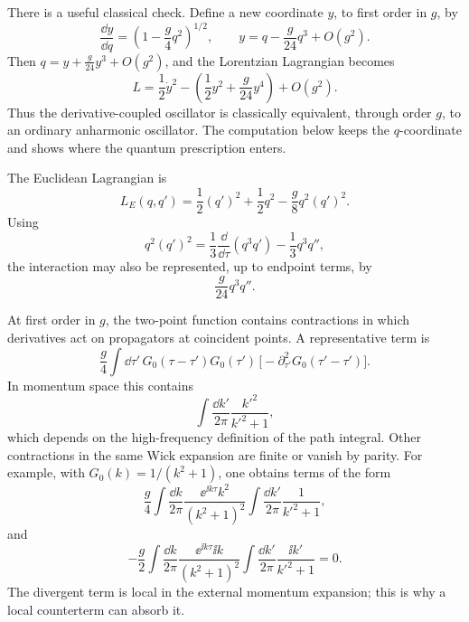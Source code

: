 There is a useful classical check. Define a new coordinate \(y\), to first
order in \(g\), by
\[
  \frac{\dd y}{\dd q}
  =
  \left(1-\frac{g}{4}q^2\right)^{1/2},
  \qquad
  y=q-\frac{g}{24}q^3+O(g^2).
\]
Then \(q=y+\frac{g}{24}y^3+O(g^2)\), and the Lorentzian Lagrangian becomes
\[
  L
  =
  \frac12\dot y^2
  -
  \left(
    \frac12y^2+\frac{g}{24}y^4
  \right)
  +O(g^2).
\]
Thus the derivative-coupled oscillator is classically equivalent, through
order \(g\), to an ordinary anharmonic oscillator. The computation below keeps
the \(q\)-coordinate and shows where the quantum prescription enters.

The Euclidean Lagrangian is
\[
  L_E(q,q')
  =
  \frac12(q')^2+\frac12q^2-\frac{g}{8}q^2(q')^2 .
\]
Using
\[
  q^2(q')^2
  =
  \frac13\frac{\dd}{\dd\tau}(q^3q')
  -\frac13q^3q'',
\]
the interaction may also be represented, up to endpoint terms, by
\[
  \frac{g}{24}q^3q''.
\]

At first order in \(g\), the two-point function contains contractions in
which derivatives act on propagators at coincident points. A representative
term is
\[
  \frac{g}{4}\int\dd\tau'\,
  G_0(\tau-\tau')G_0(\tau')\,
  \bigl[-\partial_{\tau'}^2G_0(\tau'-\tau')\bigr].
\]
In momentum space this contains
\[
  \int\frac{\dd k'}{2\pi}\frac{k'^2}{k'^2+1},
\]
which depends on the high-frequency definition of the path integral.
Other contractions in the same Wick expansion are finite or vanish by parity.
For example, with \(G_0(k)=1/(k^2+1)\), one obtains terms of the form
\[
  \frac{g}{4}
  \int\frac{\dd k}{2\pi}
    \frac{\ee^{\ii k\tau}k^2}{(k^2+1)^2}
  \int\frac{\dd k'}{2\pi}\frac{1}{k'^2+1},
\]
and
\[
  -\frac{g}{2}
  \int\frac{\dd k}{2\pi}
    \frac{\ee^{\ii k\tau}\ii k}{(k^2+1)^2}
  \int\frac{\dd k'}{2\pi}\frac{\ii k'}{k'^2+1}=0.
\]
The divergent term is local in the external momentum expansion; this is why a
local counterterm can absorb it.

